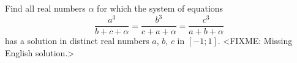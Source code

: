 \problem
Find all real numbers $\alpha$ for which the system of equations
\[
    \frac{a^3}{b + c + \alpha}
=
    \frac{b^3}{c + a + \alpha}
=
    \frac{c^3}{a + b + \alpha}
\]
has a solution in distinct real numbers $a$, $b$, $c$ in $[-1; 1]$.
\solution
<FIXME: Missing English solution.>
\endproblem
